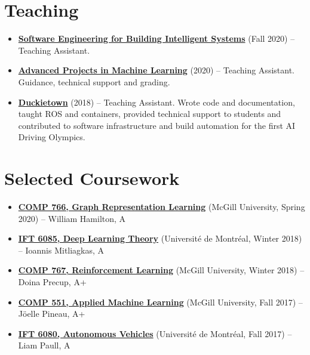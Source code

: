 \documentclass[letterpaper,11pt]{article}
\newcommand{\resumeItem}[2]{
\item\small{
\textbf{#1}{ #2 \vspace{-2pt}}
}
}
\newcommand{\resumeSubItem}[2]{\resumeItem{#1}{#2}}
\newcommand{\resumeSubHeadingListStart}{\begin{itemize}[leftmargin=*]}
\newcommand{\resumeSubHeadingListEnd}{\end{itemize}}
\begin{document}
\begin{justify}
\section{Teaching}
\resumeSubHeadingListStart
\resumeSubItem{\href{https://github.com/jin-guo/COMP598_Fall2020}{Software Engineering for Building Intelligent Systems}}{(Fall 2020) -- Teaching Assistant.}
\resumeSubItem{\href{https://admission.umontreal.ca/cours-et-horaires/cours/IFT-6759/}{Advanced Projects in Machine Learning}}{(2020) -- Teaching Assistant. Guidance, technical support and grading.}
\resumeSubItem{\href{https://duckietown.org/}{Duckietown}}{(2018) -- Teaching Assistant. Wrote code and documentation, taught ROS and containers, provided technical support to students and contributed to software infrastructure and build automation for the first AI Driving Olympics.}
\resumeSubHeadingListEnd

\section{Selected Coursework}
\resumeSubHeadingListStart
\resumeSubItem{\href{https://cs.mcgill.ca/~wlh/comp766/}{COMP 766, Graph Representation Learning}}{(McGill University, Spring 2020) -- William Hamilton, A}
\resumeSubItem{\href{https://mitliagkas.github.io/ift6085-dl-theory-class/}{IFT 6085, Deep Learning Theory}}{(Universit\'e de Montr\'eal, Winter 2018) -- Ioannis Mitliagkas, A}
\resumeSubItem{\href{https://www.cs.mcgill.ca/~dprecup/courses/rl.html}{COMP 767, Reinforcement Learning}}{(McGill University, Winter 2018) -- Doina Precup, A+}
\resumeSubItem{\href{https://www.cs.mcgill.ca/~jpineau/comp551/index.html}{COMP 551, Applied Machine Learning}}{(McGill University, Fall 2017) -- J\"oelle Pineau, A+}
\resumeSubItem{\href{http://liampaull.ca/courses/duckietown/index.html}{IFT 6080, Autonomous Vehicles}}{(Universit\'e de Montr\'eal, Fall 2017) -- Liam Paull, A}
\resumeSubHeadingListEnd


\end{justify}
\end{document}
